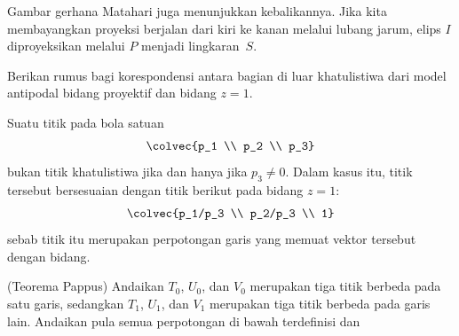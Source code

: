 \begin{exercises}
\begin{answer}
      Gambar gerhana Matahari juga menunjukkan kebalikannya.
      Jika kita membayangkan proyeksi berjalan dari kiri ke kanan melalui lubang
      jarum, elips $I$ diproyeksikan melalui $P$ menjadi lingkaran~$S$.
    \end{answer}
  \item \label{exer:CorrProjPlaneEucPl} 
    Berikan rumus bagi korespondensi antara bagian di luar khatulistiwa dari
    model antipodal bidang proyektif dan bidang $z=1$.
    \begin{answer}
      Suatu titik pada bola satuan
      \begin{equation*}
        \colvec{p_1 \\ p_2 \\ p_3} 
      \end{equation*}
      bukan titik khatulistiwa jika dan hanya jika $p_3\neq 0$.
      Dalam kasus itu, titik tersebut bersesuaian dengan titik berikut pada
      bidang $z=1$:
      \begin{equation*}
        \colvec{p_1/p_3 \\ p_2/p_3  \\ 1}
      \end{equation*}
      sebab titik itu merupakan perpotongan garis yang memuat vektor tersebut
      dengan bidang.
    \end{answer}
  \item 
    (Teorema Pappus)
    Andaikan $T_0$, $U_0$, dan $V_0$ merupakan tiga titik berbeda pada satu
    garis, sedangkan $T_1$, $U_1$, dan $V_1$ merupakan tiga titik berbeda pada
    garis lain. Andaikan pula semua perpotongan di bawah terdefinisi dan

\end{exercises}
